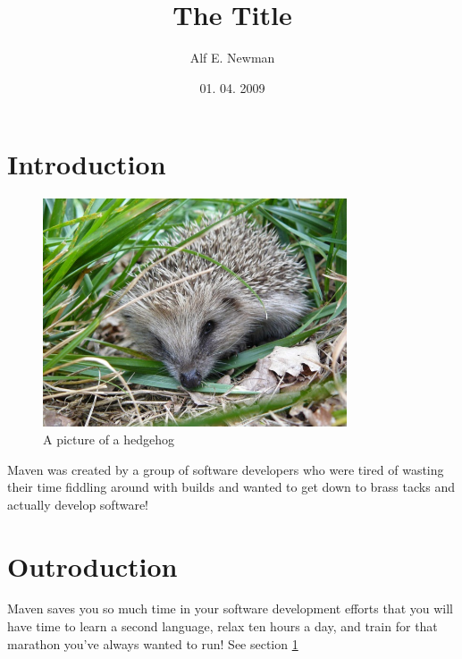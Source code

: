 \documentclass[11pt]{article}
\begin{document}
\title{The Title}
\author{Alf E. Newman}
\date{01. 04. 2009}
\maketitle

\section{Introduction}
\label{sec_Introduction}

\begin{figure}[h]
  \includegraphics[width=90mm]{hedgehog.jpg}
  \caption{A picture of a hedgehog}
\end{figure}

Maven was created by a group of software developers who were tired of wasting their time fiddling around with builds and wanted to get down to brass tacks and actually develop software!


\section{Outroduction}
Maven saves you so much time in your software development efforts that you will have time to learn a second language, relax ten hours a day, and train for that marathon you've always wanted to run! See section \ref{sec_Introduction}
  
\listoffigures
\end{document}

